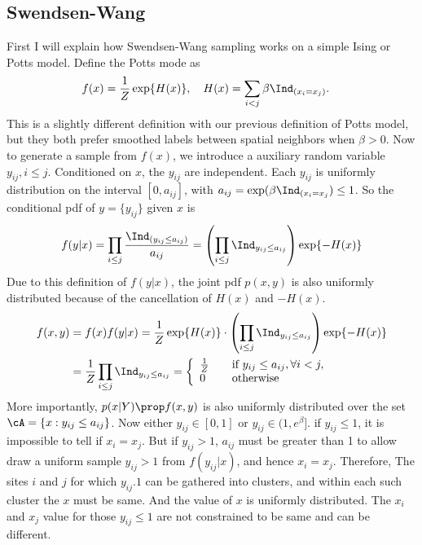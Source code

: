 \documentclass[12pt]{article}
\begin{document}
\subsection{Swendsen-Wang}
First I will explain how Swendsen-Wang sampling works on a simple Ising or Potts model. Define the Potts mode as
\begin{align*}
  f(x) &= \frac{1}{Z}\exp \{H(x)\}, \quad H(x) = \sum_{i<j} \beta \Ind_{(x_i = x_j)}.
\end{align*}
This is a slightly different definition with our previous definition of Potts model, but they both prefer smoothed labels between spatial neighbors when $\beta > 0$. Now to generate a sample from $f(x)$, we introduce a auxiliary random variable $y_{ij}, i \le j$. Conditioned on $x$, the $y_{ij}$ are independent. Each $y_{ij}$ is uniformly distribution on the interval $[0, a_{ij}]$, with $a_{ij} = \exp(\beta\Ind_{(x_i = x_j} ) \leq 1$. So the conditional pdf of $y = \{y_{ij}\}$ given $x$ is
\begin{equation*}
  f(y|x) = \prod_{i\le j}\frac{\Ind_{(y_{ij} \leq a_{ij})}}{a_{ij}} = \left (\prod_{i\le j}\Ind_{y_{ij} \leq a_{ij}} \right )\exp \{-H(x)\}
\end{equation*}
Due to this definition of $f(y|x)$, the joint pdf $p(x,y)$ is also uniformly distributed because of the cancellation of $H(x)$ and $-H(x)$.
\begin{align*}
  f(x,y) &= f(x) f(y|x) = \frac{1}{Z}\exp\{H(x)\} \cdot  \left (\prod_{i\le j}\Ind_{y_{ij} \leq a_{ij}} \right )\exp \{-H(x)\} \\
  & =  \frac{1}{Z} \prod_{i\le j}\Ind_{y_{ij} \leq a_{ij}} = \left \{
  \begin{array}{l l}
    \frac{1}{Z} & \quad \text{if $y_{ij} \leq a_{ij}, \forall i < j,$}\\
    0 & \quad \text{otherwise}\\
    \end{array} \right.
\end{align*}
More importantly, $p(x|Y) \prop f(x,y)$ is also uniformly distributed over the set $\cA = \{x: y_{ij} \leq a_{ij}\}$. Now either $y_{ij} \in [0, 1]$ or $y_{ij} \in (1, e^\beta]$. if $y_{ij} \leq 1$, it is impossible to tell if $x_i = x_j$. But if $y_{ij} > 1$, $a_{ij} $ must be greater than 1 to allow draw a uniform sample $y_{ij} > 1$ from $f(y_{ij} | x)$, and hence $x_i = x_j$. Therefore, The sites $i$ and $j$ for which $y_{ij} . 1$ can be gathered into clusters, and within each such cluster the $x$ must be same. And the value of $x$ is uniformly distributed. The $x_i$  and $x_j$ value for those $y_{ij} \leq 1$ are not constrained to be same and can be different.
\end{document}

